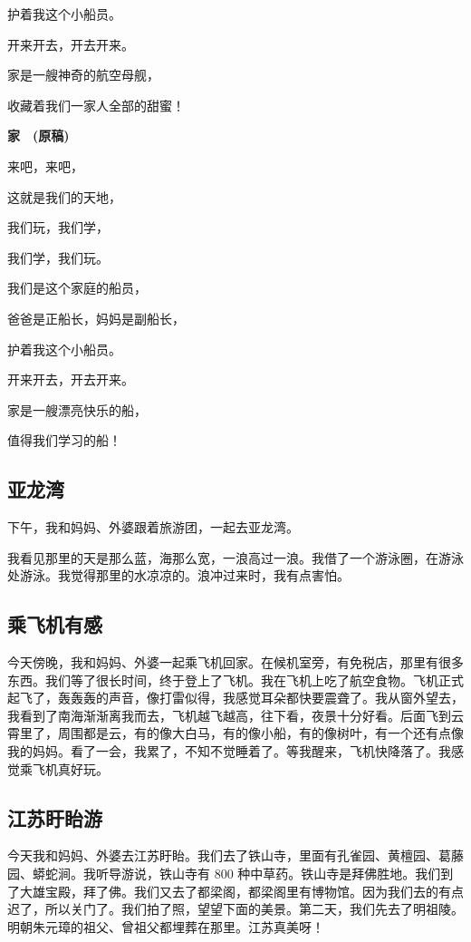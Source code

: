 \documentclass[UTF8,a4paper,titlepage,twoside,10.5pt]{article}
\begin{document}
护着我这个小船员。

开来开去，开去开来。

家是一艘神奇的航空母舰，

收藏着我们一家人全部的甜蜜！

\vspace*{\baselineskip}

\textbf{家　(原稿)}

来吧，来吧，

这就是我们的天地，

我们玩，我们学，

我们学，我们玩。

我们是这个家庭的船员，

爸爸是正船长，妈妈是副船长，

护着我这个小船员。

开来开去，开去开来。

家是一艘漂亮快乐的船，

值得我们学习的船！

\subsection{亚龙湾}
\label{sec:org9e3c58c}

下午，我和妈妈、外婆跟着旅游团，一起去亚龙湾。

我看见那里的天是那么蓝，海那么宽，一浪高过一浪。我借了一个游泳圈，在游泳处游泳。我觉得那里的水凉凉的。浪冲过来时，我有点害怕。

\subsection{乘飞机有感}
\label{sec:orga492d3c}

今天傍晚，我和妈妈、外婆一起乘飞机回家。在候机室旁，有免税店，那里有很多东西。我们等了很长时间，终于登上了飞机。我在飞机上吃了航空食物。飞机正式起飞了，轰轰轰的声音，像打雷似得，我感觉耳朵都快要震聋了。我从窗外望去，我看到了南海渐渐离我而去，飞机越飞越高，往下看，夜景十分好看。后面飞到云霄里了，周围都是云，有的像大白马，有的像小船，有的像树叶，有一个还有点像我的妈妈。看了一会，我累了，不知不觉睡着了。等我醒来，飞机快降落了。我感觉乘飞机真好玩。

\subsection{江苏盱眙游}
\label{sec:org82c154f}

今天我和妈妈、外婆去江苏盱眙。我们去了铁山寺，里面有孔雀园、黄檀园、葛藤园、蟒蛇涧。我听导游说，铁山寺有 800 种中草药。铁山寺是拜佛胜地。我们到了大雄宝殿，拜了佛。我们又去了都梁阁，都梁阁里有博物馆。因为我们去的有点迟了，所以关门了。我们拍了照，望望下面的美景。第二天，我们先去了明祖陵。明朝朱元璋的祖父、曾祖父都埋葬在那里。江苏真美呀！
\end{document}
